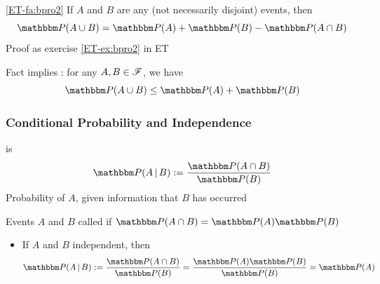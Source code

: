 \begin{frame}

    \vspace{2em}
    \Fact\eqref{ET-fa:bpro2}
	If $A$ and $B$ are any (not necessarily disjoint) events, then
    \begin{equation*}
        \PP(A \cup B) = \PP(A) + \PP(B) - \PP(A \cap B)       
    \end{equation*}
    Proof as exercise \ref{ET-ex:bpro2} in ET

    Fact implies : for any $A, B \in \mathscr F$, we have 
    \begin{equation*}
        \PP(A \cup B) \leq \PP(A) + \PP(B)
    \end{equation*}
    
\end{frame}

\begin{frame}\frametitle{Conditional Probability and Independence}

    \vspace{2em}
     is 
    \begin{equation}
      \label{eq:efcp}
      \PP(A \,|\, B) := \frac{\PP(A \cap B)}{\PP(B)}
    \end{equation}
    Probability of $A$, given information that $B$ has occurred

\end{frame}

\begin{frame}

    \vspace{2em}
    Events $A$ and $B$ called  if $\PP(A \cap B) = \PP(A) \PP(B)$
    
    \begin{itemize}
        \item If $A$ and $B$ independent, then 
            \begin{equation*}
                \PP(A \,|\, B) 
                := \frac{\PP(A \cap B)}{\PP(B)} 
                = \frac{\PP(A) \PP(B)}{\PP(B)} 
                = \PP(A)
            \end{equation*}
            
    \end{itemize}
    
\end{frame}


